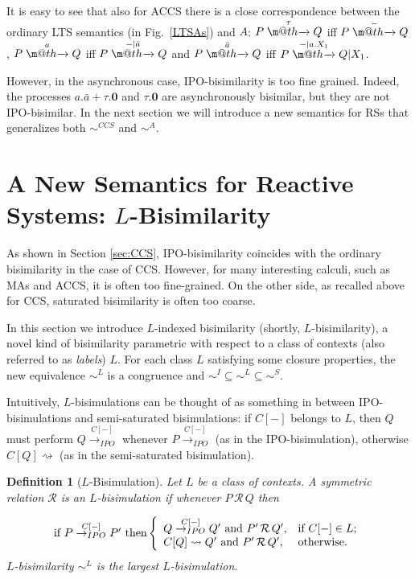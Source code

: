 \documentclass[copyright,creativecommons]{eptcs}
\makeatletter
\newcommand{\bisl}{\sim^{L}}
\newcommand{\nil}{\mathbf{0}}
\def\tr#1{\stackrel{#1}{\to}}
\def\IPOtr#1{\stackrel{#1}{\rightarrowfill_{IPO}}}
\let\oldrightarrow\to
\renewcommand{\to}[1][]{\ifthenelse{\equal{#1}{}}{\oldrightarrow}{\ensuremath{\xrightarrow{{}_{#1}}}}}
\def \rightarrowfill{\m@th\mathord{\smash-}\mkern-6mu\cleaders\hbox{$\mkern-2mu\mathord{\smash-}\mkern-2mu$}\hfill
  \mkern-6mu\mathord\rightarrow}
\def\tr#1{\stackrel{#1}{\rightarrowfill}}
\def\IPOtr#1{\stackrel{#1}{\rightarrow_{IPO}}}
\newcommand{\react}{\rightsquigarrow}
\newcommand{\<}{\langle}
\renewcommand{\>}{\rangle}
\def\tr#1{\stackrel{#1}{\rightarrowfill}}
\def \rightarrowfill{\m@th\mathord{\smash-}\mkern-6mu\cleaders\hbox{$\mkern-2mu\mathord{\smash-}\mkern-2mu$}\hfill
  \mkern-6mu\mathord\rightarrow}
\newtheorem{definition}{Definition}{}
\makeatother
\begin{document}
It is easy to see that also for ACCS there is a
close correspondence between the ordinary LTS semantics (in
Fig.~\ref{LTSAs}) and $A$: $P\tr{\tau}Q$ iff $P\tr{-}Q$,
$P\tr{a}Q$ iff $P \tr{-|\bar{a}} Q$ and $P\tr{\bar{a}}Q$ iff $P
\tr{-|a.X_1} Q|X_1$.

However, in the asynchronous case, IPO-bisimilarity is too fine
grained. Indeed, the processes $a.\bar{a} + \tau.\nil$ and
$\tau.\nil$ are asynchronously bisimilar, but they are not
IPO-bisimilar. In the next section we will introduce a new semantics
for RSs that generalizes both $\sim^{CCS}$ and
$\sim^A$.




\section{A New Semantics for Reactive Systems: $L$-Bisimilarity} \label{sec:L1-Bisimulation}

As shown in Section \ref{sec:CCS}, IPO-bisimilarity coincides with the
ordinary bisimilarity in the case of CCS.  However, for many
interesting calculi, such as MAs and ACCS, it is often too
fine-grained. On the other side, as recalled above for CCS, saturated
bisimilarity is often too coarse.

In this section we introduce $L$-indexed bisimilarity (shortly,
$L$-bisimilarity), a novel kind of bisimilarity parametric with
respect to a class of contexts (also referred to as \emph{labels})
$L$. For each class $L$ satisfying some closure properties, the new
equivalence $\bisl$ is a congruence and $\sim^I \subseteq \bisl
\subseteq \sim^S$.

Intuitively, $L$-bisimulations can be thought of as something in between
IPO-bisimulations and semi-saturated bisimulations: if $C[-]$ belongs
to $L$, then $Q$ must perform $Q\IPOtr{C[-]}$ whenever $P\IPOtr{C[-]}$
(as in the IPO-bisimulation), otherwise $C[Q]\react$ (as in the
semi-saturated bisimulation).

\begin{definition}[$L$-Bisimulation]\label{def:L1bis}
Let $L$ be a class of contexts.
A symmetric relation $\mathcal R$ is an $L$-\emph{bisimulation} if
whenever $P\, \mathcal R\,Q$ then

\[
\hbox{if $P\IPOtr{C[-]}P'$ then}
\left\{\begin{array}{ll}
    Q\IPOtr{C[-]}Q' \hbox{ and } P'\, \mathcal R\,Q', & \hbox{if $C[-]\in L$;} \\
    C[Q]\react Q' \hbox{ and } P'\, \mathcal R\,Q', & \hbox{otherwise.} \\
\end{array}\right.
\]
$L$-\emph{bisimilarity} $\bisl$ is the largest $L$-bisimulation.
\end{definition}
\end{document}
